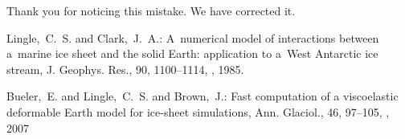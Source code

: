 \documentclass[10pt]{article}
\begin{document}
Thank you for noticing this mistake. We have corrected it.

\begin{thebibliography}{69}

Lingle,~C.~S. and Clark,~J.~A.: A~numerical model of interactions between a~marine ice sheet and the solid Earth: application to a~West Antarctic ice stream, J. Geophys. Res., 90, 1100--1114, , 1985.

Bueler,~E. and Lingle,~C.~S. and Brown,~J.: Fast computation of a viscoelastic deformable Earth model for ice-sheet simulations, Ann. Glaciol., 46, 97--105, , 2007

\end{thebibliography}

\end{document}
